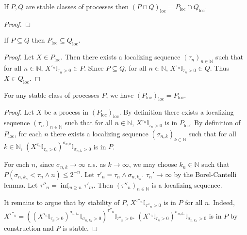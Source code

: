 \begin{lemma}\label{lem:locally_inter}
If $P, Q$ are stable classes of processes then $(P\cap Q)_{\mathrm{loc}} = P_{\mathrm{loc}}\cap Q_{\mathrm{loc}}$.
\end{lemma}

\begin{proof}

\end{proof}


\begin{lemma}\label{lem:locally_mono}
If $P \subseteq Q$ then $P_{\mathrm{loc}} \subseteq Q_{\mathrm{loc}}$.
\end{lemma}

\begin{proof}
Let $X \in P_{\mathrm{loc}}$.
Then there exists a localizing sequence $(\tau_n)_{n \in \mathbb{N}}$ such that for all $n \in \mathbb{N}$, $X^{\tau_n}\mathbb{I}_{\tau_n > 0} \in P$.
Since $P \subseteq Q$, for all $n \in \mathbb{N}$, $X^{\tau_n}\mathbb{I}_{\tau_n > 0} \in Q$.
Thus $X \in Q_{\mathrm{loc}}$.
\end{proof}


\begin{lemma}\label{lem:locally_locally}
For any stable class of processes $P$, we have $(P_{\mathrm{loc}})_{\mathrm{loc}} = P_{\mathrm{loc}}$.
\end{lemma}

\begin{proof}
Let $X$ be a process in $(P_{\mathrm{loc}})_{\mathrm{loc}}$.
By definition there exists a localizing sequence $(\tau_n)_{n \in \mathbb{N}}$ such that for all $n \in \mathbb{N}$, $X^{\tau_n}\mathbb{I}_{\tau_n > 0}$ is in $P_{\mathrm{loc}}$.
By definition of $P_{\mathrm{loc}}$, for each $n$ there exists a localizing sequence $(\sigma_{n,k})_{k \in \mathbb{N}}$ such that for all $k \in \mathbb{N}$, $(X^{\tau_n}\mathbb{I}_{\tau_n > 0})^{\sigma_{n,k}}\mathbb{I}_{\sigma_{n,k} > 0}$ is in $P$.

For each $n$, since $\sigma_{n,k} \to \infty$ a.s. as $k \to \infty$, we may choose $k_n \in \mathbb{N}$ such that $P(\sigma_{n,k_n} < \tau_n \wedge n) \le 2^{-n}$.
Let $\tau'_n = \tau_n \wedge \sigma_{n,k_n}$. $\tau_n' \to \infty$ by the Borel-Cantelli lemma.
Let $\tau''_n = \inf_{m \ge n} \tau'_m$.
Then $(\tau''_n)_{n \in \mathbb{N}}$ is a localizing sequence.

It remains to argue that by stability of $P$, $X^{\tau''_n}\mathbb{I}_{\tau''_n > 0}$ is in $P$ for all $n$.
Indeed, $X^{\tau''_n} = ((X^{\tau_n}\mathbb{I}_{\tau_n > 0})^{\sigma_{n,k_n}}\mathbb{I}_{\sigma_{n,k_n} > 0})^{\tau''_n}\mathbb{I}_{\tau''_n > 0}$. $(X^{\tau_n}\mathbb{I}_{\tau_n > 0})^{\sigma_{n,k_n}}\mathbb{I}_{\sigma_{n,k_n} > 0}$ is in $P$ by construction and $P$ is stable.
\end{proof}


